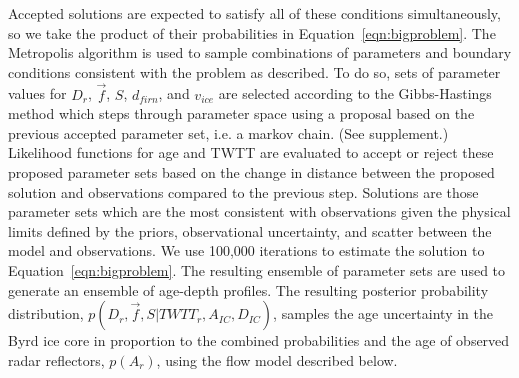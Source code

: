 Accepted solutions are expected to satisfy all of these conditions simultaneously, so we take the product of their probabilities in Equation~\ref{eqn:bigproblem}. The Metropolis algorithm \citep{metropolis1953} is used to sample combinations of parameters and boundary conditions consistent with the problem as described. To do so, sets of parameter values for $D_r$, $\vec{f}$, $S$, $d_{firn}$, and $v_{ice}$ are selected according to the Gibbs-Hastings method which steps through parameter space using a proposal based on the previous accepted parameter set, i.e. a markov chain.  (See supplement.) %
Likelihood functions for age and TWTT are evaluated to accept or reject these proposed parameter sets based on the change in distance between the proposed solution and observations compared to the previous step. Solutions are those parameter sets which are the most consistent with observations given the physical limits defined by the priors, observational uncertainty, and scatter between the model and observations. We use 100,000 iterations to estimate the solution to Equation~\ref{eqn:bigproblem}. The resulting ensemble of parameter sets are used to generate an ensemble of age-depth profiles. The resulting posterior probability distribution, $p(D_r, \vec{f},S | TWTT_r, A_{IC}, D_{IC})$, samples the age uncertainty in the Byrd ice core in proportion to the combined probabilities and the age of observed radar reflectors, $p(A_r)$, using the flow model described below.



\label{radardepth}

%



